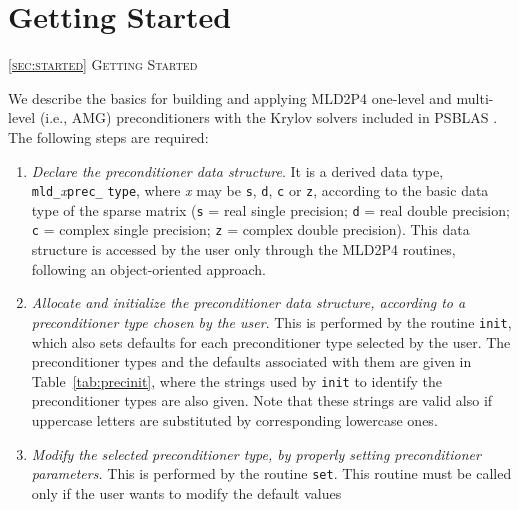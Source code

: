 \section{Getting Started\label{sec:started}}
         {\textsc{\ref{sec:started} Getting Started}}

We describe the basics for building and applying MLD2P4 one-level and multi-level
(i.e., AMG) preconditioners with the Krylov solvers included in PSBLAS \cite{PSBLASGUIDE}.
The following steps are required:
\begin{enumerate} 
\item \emph{Declare the preconditioner data structure}. It is a derived data type,
  \verb|mld_|\-\emph{x}\verb|prec_| \verb|type|, where \emph{x} may be \verb|s|, \verb|d|, \verb|c|
	or \verb|z|, according to the basic data type of the sparse matrix
	(\verb|s| = real single precision; \verb|d| = real double precision;
	\verb|c| = complex single precision; \verb|z| = complex double precision).
	This data structure is accessed by the user only through the MLD2P4 routines,
	following an object-oriented approach.
\item \emph{Allocate and initialize the preconditioner data structure, according to
	a preconditioner type chosen by the user}. This is performed by the routine
	\verb|init|, which also sets defaults for each preconditioner
	type selected by the user. The preconditioner types and the defaults associated
	with them are given in Table~\ref{tab:precinit}, where the strings used by
	\verb|init| to identify the preconditioner types are also given.
	Note that these strings are valid also if uppercase letters are substituted by
	corresponding lowercase ones.
\item \emph{Modify the selected preconditioner type, by properly setting
  preconditioner parameters.} This is performed by the routine \verb|set|.
  This routine must be called only if the user wants to modify the default values

\end{enumerate}
